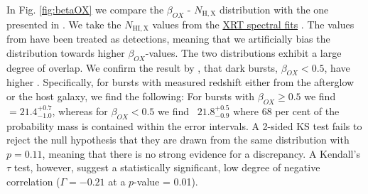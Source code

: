 \documentclass[longauth]{aa}    %
\begin{document}
In Fig. \ref{fig:betaOX} we compare the $\beta_{OX}$ - $N_{\mathrm{H, X}}$
distribution with the one presented in \citet{Fynbo2009}. We take the
$N_{\mathrm{HI,X}}$ values from the
\href{http://www.swift.ac.uk/xrt_spectra}{XRT spectral fits} \citep{Evans2009}.
The values from \citet{Fynbo2009} have been treated as detections, meaning that
we artificially bias the distribution towards higher $\beta_{OX}$-values. The
two distributions exhibit a large degree of overlap. We confirm the
result by \citet{Fynbo2009}, that dark bursts, $\beta_{OX} < 0.5$, have higher
\nhx. Specifically, for bursts with measured redshift either from the afterglow
or the host galaxy, we find the following: For bursts with $\beta_{OX} \geq 0.5$
we find \nhx~$ = 21.4_{-1.0}^{+0.7}$, whereas for $\beta_{OX} < 0.5$ we find
\nhx~$21.8_{-0.9}^{+0.5}$ where 68 per cent of the probability mass is contained
within the error intervals. A 2-sided KS test fails to reject the null
hypothesis that they are drawn from the same distribution with $p = 0.11$,
meaning that there is no strong evidence for a discrepancy. A Kendall's $\tau$
test, however, suggest a statistically significant, low degree of negative
correlation ($\Gamma = -0.21$ at a $p$-value = 0.01).
\end{document}
